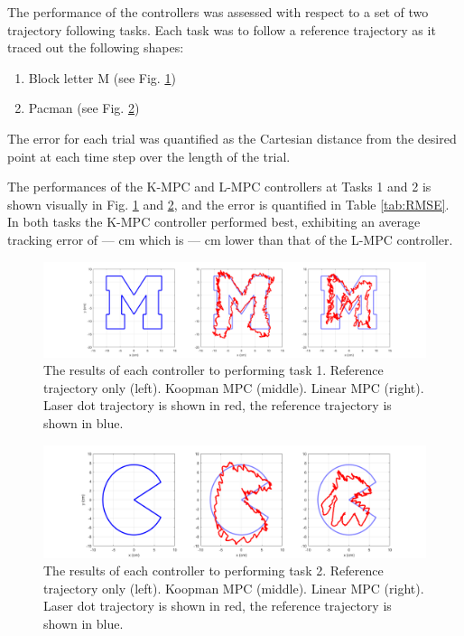 
The performance of the controllers was assessed with respect to a set of two trajectory following tasks.
Each task was to follow a reference trajectory as it traced out the following shapes:
\begin{enumerate}
    \item Block letter M (see Fig. \ref{fig:compare_blockM})
    \item Pacman (see Fig. \ref{fig:compare_pacman})
\end{enumerate}
The error for each trial was quantified as the Cartesian distance from the desired point at each time step over the length of the trial.

The performances of the K-MPC and L-MPC controllers at Tasks 1 and 2 is shown visually in Fig. \ref{fig:compare_blockM} and \ref{fig:compare_pacman}, and the error is quantified in Table \ref{tab:RMSE}.
In both tasks the K-MPC controller performed best, exhibiting an average tracking error of --- cm which is --- cm lower than that of the L-MPC controller.



\begin{figure}
    \centering
    \includegraphics[width=\linewidth]{figures/compare_blockM_300s_draft.png}
    \caption{The results of each controller to performing task 1. Reference trajectory only (left). Koopman MPC (middle). Linear MPC (right). Laser dot trajectory is shown in red, the reference trajectory is shown in blue.}
    \label{fig:compare_blockM}
\end{figure}

\begin{figure}
    \centering
    \includegraphics[width=\linewidth]{figures/compare_pacman68_90s_draft.png}
    \caption{The results of each controller to performing task 2. Reference trajectory only (left). Koopman MPC (middle). Linear MPC (right). Laser dot trajectory is shown in red, the reference trajectory is shown in blue.}
    \label{fig:compare_pacman}
\end{figure}

